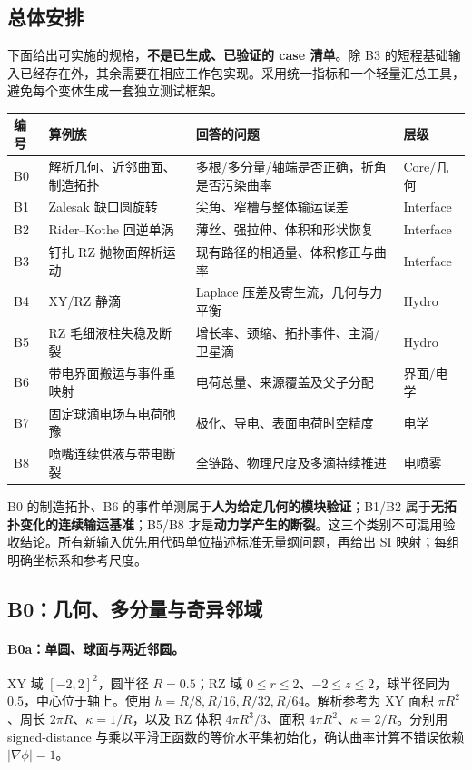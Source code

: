 \documentclass[11pt,a4paper]{article}
\begin{document}
\subsection{总体安排}
下面给出可实施的规格，\textbf{不是已生成、已验证的 case 清单}。除 B3 的短程基础输入已经存在外，其余需要在相应工作包实现。采用统一指标和一个轻量汇总工具，避免每个变体生成一套独立测试框架。
\begin{longtable}{L{10mm}L{44mm}L{69mm}L{20mm}}
\toprule 编号 & 算例族 & 回答的问题 & 层级\\\midrule\endhead
B0 & 解析几何、近邻曲面、制造拓扑 & 多根/多分量/轴端是否正确，折角是否污染曲率 & Core/几何\\
B1 & Zalesak 缺口圆旋转 & 尖角、窄槽与整体输运误差 & Interface\\
B2 & Rider--Kothe 回逆单涡 & 薄丝、强拉伸、体积和形状恢复 & Interface\\
B3 & 钉扎 RZ 抛物面解析运动 & 现有路径的相通量、体积修正与曲率 & Interface\\
B4 & XY/RZ 静滴 & Laplace 压差及寄生流，几何与力平衡 & Hydro\\
B5 & RZ 毛细液柱失稳及断裂 & 增长率、颈缩、拓扑事件、主滴/卫星滴 & Hydro\\
B6 & 带电界面搬运与事件重映射 & 电荷总量、来源覆盖及父子分配 & 界面/电学\\
B7 & 固定球滴电场与电荷弛豫 & 极化、导电、表面电荷时空精度 & 电学\\
B8 & 喷嘴连续供液与带电断裂 & 全链路、物理尺度及多滴持续推进 & 电喷雾\\\bottomrule
\end{longtable}

B0 的制造拓扑、B6 的事件单测属于\textbf{人为给定几何的模块验证}；B1/B2 属于\textbf{无拓扑变化的连续输运基准}；B5/B8 才是\textbf{动力学产生的断裂}。这三个类别不可混用验收结论。所有新输入优先用代码单位描述标准无量纲问题，再给出 SI 映射；每组明确坐标系和参考尺度。

\subsection{B0：几何、多分量与奇异邻域}
\paragraph{B0a：单圆、球面与两近邻圆。}
XY 域 $[-2,2]^2$，圆半径 $R=0.5$；RZ 域 $0\leq r\leq2$、$-2\leq z\leq2$，球半径同为 $0.5$，中心位于轴上。使用 $h=R/8,R/16,R/32,R/64$。解析参考为 XY 面积 $\pi R^2$、周长 $2\pi R$、$\kappa=1/R$，以及 RZ 体积 $4\pi R^3/3$、面积 $4\pi R^2$、$\kappa=2/R$。分别用 signed-distance 与乘以平滑正函数的等价水平集初始化，确认曲率计算不错误依赖 $|\nabla\phi|=1$。
\end{document}

